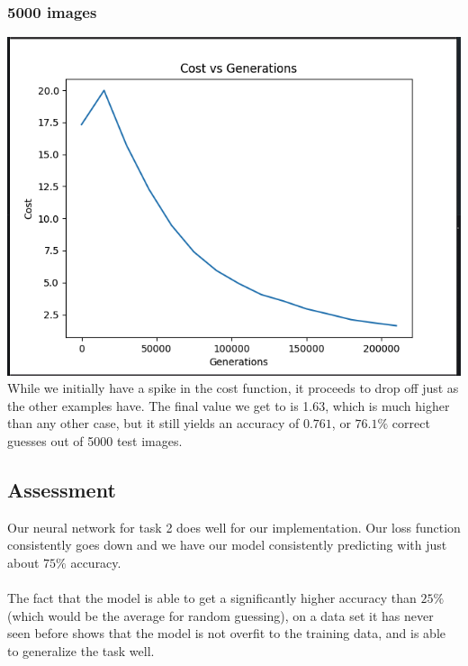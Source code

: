 \documentclass[12pt]{article}
\begin{document}
\subsubsection*{5000 images}
\includegraphics*[scale=0.5]{5ktask2}\\
While we initially have a spike in the cost function, it proceeds to drop off just as the other examples have. The final 
value we get to is 1.63, which is much higher than any other case, but it still yields an accuracy of $0.761$, or 
$76.1 \%$ correct guesses out of 5000 test images.   

\subsection*{Assessment}
Our neural network for task 2 does well for our implementation. Our loss function consistently goes down and we 
have our model consistently predicting with just about $75 \%$ accuracy. 
\\
\\
The fact that the model is able 
to get a significantly higher accuracy than $25 \%$ (which would be the average for random guessing), on a 
data set it has never seen before shows that the model is not overfit to the training data, and is able to generalize the 
task well.   
\end{document}

